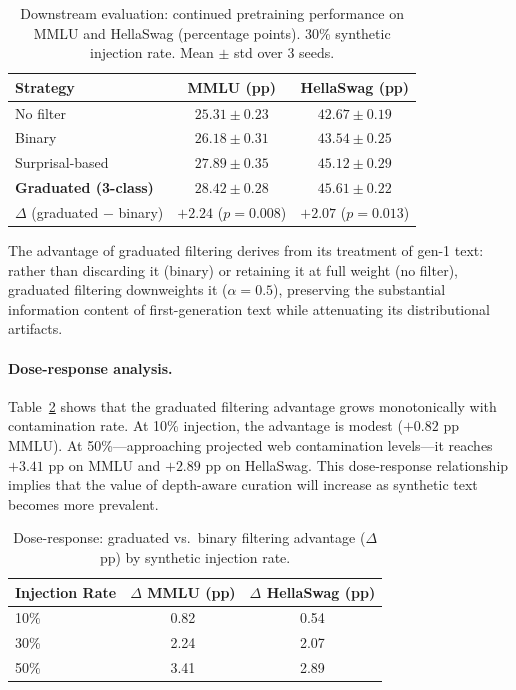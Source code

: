 \documentclass[11pt,a4paper]{article}
\begin{document}
\begin{table}[t]
\centering
\small
\caption{Downstream evaluation: continued pretraining performance on MMLU and HellaSwag (percentage points). 30\% synthetic injection rate. Mean $\pm$ std over 3 seeds.}
\label{tab:downstream}
\begin{tabular}{@{}lcc@{}}
\toprule
\textbf{Strategy} & \textbf{MMLU (pp)} & \textbf{HellaSwag (pp)} \\
\midrule
No filter & $25.31 \pm 0.23$ & $42.67 \pm 0.19$ \\
Binary & $26.18 \pm 0.31$ & $43.54 \pm 0.25$ \\
Surprisal-based & $27.89 \pm 0.35$ & $45.12 \pm 0.29$ \\
\textbf{Graduated (3-class)} & $\mathbf{28.42 \pm 0.28}$ & $\mathbf{45.61 \pm 0.22}$ \\
\midrule
$\Delta$ (graduated $-$ binary) & $+2.24$ ($p{=}0.008$) & $+2.07$ ($p{=}0.013$) \\
\bottomrule
\end{tabular}
\end{table}

The advantage of graduated filtering derives from its treatment of gen-1 text: rather than discarding it (binary) or retaining it at full weight (no filter), graduated filtering downweights it ($\alpha{=}0.5$), preserving the substantial information content of first-generation text while attenuating its distributional artifacts.

\paragraph{Dose-response analysis.} Table~\ref{tab:dose} shows that the graduated filtering advantage grows monotonically with contamination rate. At 10\% injection, the advantage is modest ($+0.82$ pp MMLU). At 50\%---approaching projected web contamination levels---it reaches $+3.41$ pp on MMLU and $+2.89$ pp on HellaSwag. This dose-response relationship implies that the value of depth-aware curation will increase as synthetic text becomes more prevalent.

\begin{table}[t]
\centering
\small
\caption{Dose-response: graduated vs.\ binary filtering advantage ($\Delta$ pp) by synthetic injection rate.}
\label{tab:dose}
\begin{tabular}{@{}lcc@{}}
\toprule
\textbf{Injection Rate} & $\Delta$ \textbf{MMLU (pp)} & $\Delta$ \textbf{HellaSwag (pp)} \\
\midrule
10\% & 0.82 & 0.54 \\
30\% & 2.24 & 2.07 \\
50\% & 3.41 & 2.89 \\
\bottomrule
\end{tabular}
\end{table}
\end{document}
